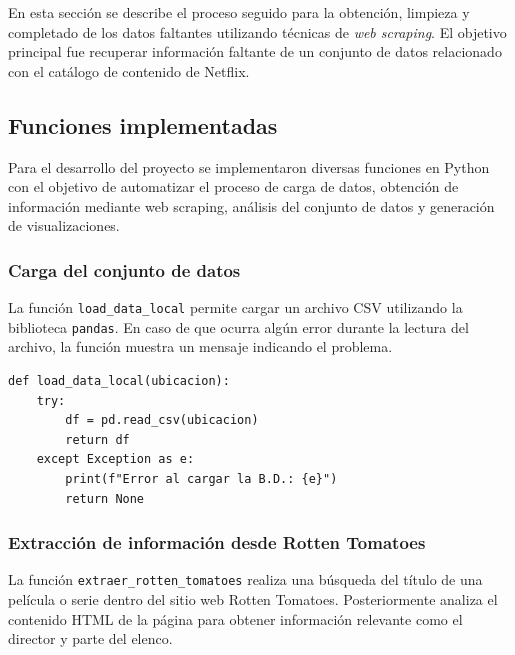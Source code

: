 \documentclass[12pt]{article}
\begin{document}
En esta sección se describe el proceso seguido para la obtención, limpieza y 
completado de los datos faltantes utilizando técnicas de \textit{web scraping}. 
El objetivo principal fue recuperar información faltante de un conjunto de datos 
relacionado con el catálogo de contenido de Netflix.

\subsection{Funciones implementadas}

Para el desarrollo del proyecto se implementaron diversas funciones en Python con el objetivo
de automatizar el proceso de carga de datos, obtención de información mediante web scraping,
análisis del conjunto de datos y generación de visualizaciones.

\subsubsection{Carga del conjunto de datos}

La función \texttt{load\_data\_local} permite cargar un archivo CSV utilizando la biblioteca
\texttt{pandas}. En caso de que ocurra algún error durante la lectura del archivo, la función
muestra un mensaje indicando el problema.

\begin{lstlisting}
def load_data_local(ubicacion):
    try:
        df = pd.read_csv(ubicacion)
        return df
    except Exception as e:
        print(f"Error al cargar la B.D.: {e}")
        return None
\end{lstlisting}

\subsubsection{Extracción de información desde Rotten Tomatoes}

La función \texttt{extraer\_rotten\_tomatoes} realiza una búsqueda del título de una película
o serie dentro del sitio web Rotten Tomatoes. Posteriormente analiza el contenido HTML de la
página para obtener información relevante como el director y parte del elenco.
\end{document}
